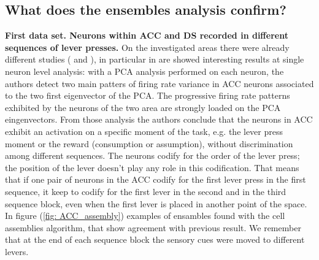 \documentclass{article}
\begin{document}
\subsection{What does the ensembles analysis confirm?}
\textbf{First data set. Neurons within ACC and DS recorded in different sequences of lever presses.}
On the investigated areas there were already different studies (\cite{Lya} and \cite{LyaN}), in particular in \cite{Lya} are showed interesting results at single neuron level analysis: with a PCA analysis performed on each neuron, the authors detect two main patters of firing rate variance in ACC neurons associated to the two first eigenvector of the PCA. The progressive firing rate patterns exhibited by the neurons of the two area are strongly loaded on the PCA eingenvectors.
From those analysis the authors conclude that the neurons in ACC exhibit an activation on a specific moment of the task, e.g. the lever press moment or the reward (consumption or assumption), without discrimination among different sequences. The neurons codify for the order of the lever press; the position of the lever doesn't play any role in this codification. That means that if one pair of neurons in the ACC codify for the first lever press in the first sequence, it keep to codify for the first lever in the second and in the third sequence block, even when the first lever is placed in another point of the space. In figure (\ref{fig: ACC_assembly}) examples of ensambles found with the cell assemblies algorithm, that show agreement with previous result. We remember that at the end of each sequence block the sensory cues were moved to different levers. 
\end{document}
